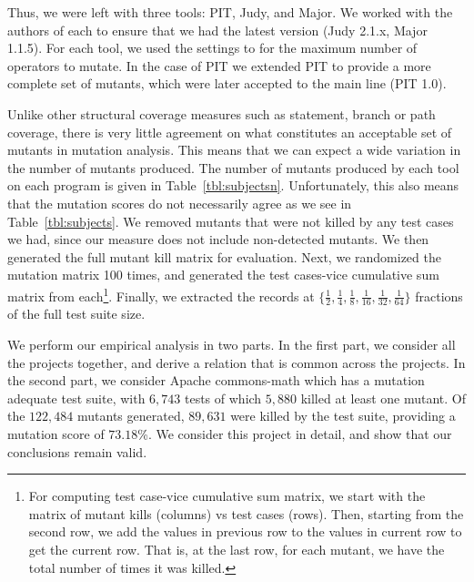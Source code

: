 \documentclass[conference]{IEEEtran}
\begin{document}
Thus, we were left with three tools: PIT, Judy, and Major. We worked with the
authors of each to ensure that we had the latest version
(Judy 2.1.x, Major 1.1.5). For each tool, we used the settings to for the
maximum number of operators to mutate. In the case of PIT we extended PIT
to provide a more complete set of mutants, which were later accepted to the
main line (PIT 1.0).

Unlike other structural coverage measures such as statement, branch or path
coverage, there is very little agreement on what constitutes an acceptable
set of mutants in mutation analysis. This means that we can expect a wide
variation in the number of mutants produced. The number of mutants produced by each
tool on each program is given in Table~\ref{tbl:subjectsn}. Unfortunately,
this also means that the mutation scores do not necessarily agree as we
see in Table~\ref{tbl:subjects}. We removed mutants
that were not killed by any test cases we had, since our measure does not
include non-detected mutants. We then generated the full mutant kill matrix
for evaluation. Next, we randomized the mutation matrix 100
times, and generated the test cases-vice cumulative sum matrix from each\footnote{
For computing test case-vice cumulative sum matrix, we start with the matrix of
mutant kills (columns) vs test cases (rows). Then, starting from the second row,
we add the values in previous row to the values in current row to get the
current row. That is, at the last row, for each mutant, we have the total number
of times it was killed.
}.
Finally, we extracted the records at
$\{\frac{1}{2},\frac{1}{4},\frac{1}{8},\frac{1}{16},\frac{1}{32},\frac{1}{64}\}$
fractions of the full test suite size.

We perform our empirical analysis in two parts. In the first part, we consider all
the projects together, and derive a relation that is common across the projects.
In the second part, we consider Apache commons-math which has a mutation
adequate test suite, with $6,743$ tests of which $5,880$ killed at least one
mutant. Of the $122,484$ mutants generated, $89,631$ were killed by the test
suite, providing a mutation score of $73.18$\%. We consider this project in
detail, and show that our conclusions remain valid.
\end{document}
